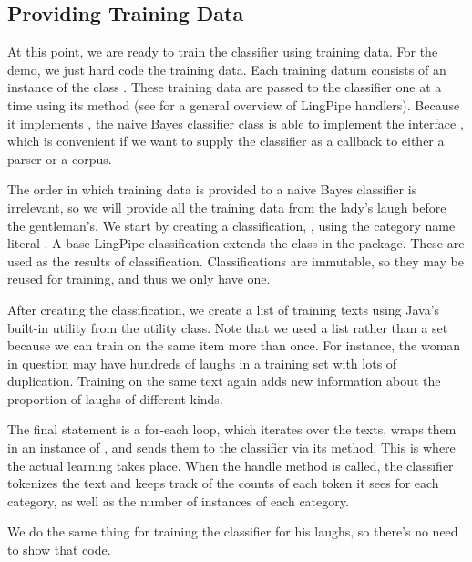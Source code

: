 \subsection{Providing Training Data}

At this point, we are ready to train the classifier using training
data.  For the demo, we just hard code the training data.  Each
training datum consists of an instance of the class
.  These training data are passed to
the classifier one at a time using its  method (see
 for a general overview of LingPipe handlers).
Because it implements , the
naive Bayes classifier class is able to implement the interface
, which is convenient if
we want to supply the classifier as a callback to either a parser or a
corpus.

The order in which training data is provided to a naive
Bayes classifier is irrelevant, so we will provide all the
training data from the lady's laugh before the gentleman's.
%
%
We start by creating a classification, , using the
category name literal .  A base LingPipe classification
extends the  class in the
 package.  These are used as the results of
classification.  Classifications are immutable, so they may be reused
for training, and thus we only have one.

After creating the classification, we create a list of training texts
using Java's built-in utility  from the 
utility class.  Note that we used a list rather than a set because we
can train on the same item more than once.  For instance, the woman in
question may have hundreds of laughs in a training set with lots of
duplication.  Training on the same text again adds new information
about the proportion of laughs of different kinds. 

The final statement is a for-each loop, which iterates over the texts,
wraps them in an instance of , and
sends them to the classifier via its
 method.  This is where the
actual learning takes place.  When the handle method is called, the
classifier tokenizes the text and keeps track of the counts of each
token it sees for each category, as well as the number of instances
of each category.  

We do the same thing for training the classifier for his laughs,
so there's no need to show that code.

